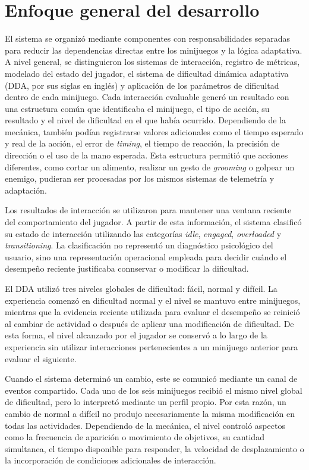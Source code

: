 \section{Enfoque general del desarrollo}
El sistema se organizó mediante componentes con responsabilidades 
separadas para reducir las dependencias directas entre los minijuegos
y la lógica adaptativa. A nivel general, se distinguieron los sistemas
de interacción, registro de métricas, modelado del estado del jugador,
el sistema de dificultad dinámica adaptativa (DDA, por sus siglas en inglés) 
y aplicación de los parámetros de dificultad 
dentro de cada minijuego. Cada interacción evaluable generó un resultado
con una estructura común que identificaba el minijuego, el tipo de 
acción, su resultado y el nivel de dificultad en el que había ocurrido. 
Dependiendo de la mecánica, también podían registrarse valores 
adicionales como el tiempo esperado y real de la acción, el error de 
\textit{timing}, el tiempo de reacción, la precisión de dirección o el 
uso de la mano esperada. Esta estructura permitió que acciones 
diferentes, como cortar un alimento, realizar un gesto de 
\textit{grooming} o golpear un enemigo, pudieran ser procesadas por los 
mismos sistemas de telemetría y adaptación.

Los resultados de interacción se utilizaron para mantener una ventana 
reciente del comportamiento del jugador. A partir de esta información,
el sistema clasificó su estado de interacción utilizando las categorías
\textit{idle}, \textit{engaged}, \textit{overloaded} y 
\textit{transitioning}. La clasificación no representó un diagnóstico
psicológico del usuario, sino una representación operacional empleada
para decidir cuándo el desempeño reciente justificaba connservar o
modificar la dificultad.

El DDA utilizó tres niveles globales de dificultad: fácil, normal y 
difícil. La experiencia comenzó en dificultad normal y el nivel se 
mantuvo entre minijuegos, mientras que la evidencia reciente 
utilizada para evaluar el desempeño se reinició al cambiar de actividad
o después de aplicar una modificación de dificultad. De esta forma, el 
nivel alcanzado por el jugador se conservó a lo largo de la experiencia
sin utilizar interacciones pertenecientes a un minijuego anterior para 
evaluar el siguiente.

Cuando el sistema determinó un cambio, este se comunicó mediante un canal
de eventos compartido. Cada uno de los seis minijuegos recibió el mismo
nivel global de dificultad, pero lo interpretó mediante un perfil propio.
Por esta razón, un cambio de normal a difícil no produjo necesariamente
la misma modificación en todas las actividades. Dependiendo de la mecánica,
el nivel controló aspectos como la frecuencia de aparición o movimiento de
objetivos, su cantidad simultanea, el tiempo disponible para responder,
la velocidad de desplazamiento o la incorporación de condiciones
adicionales de interacción.

